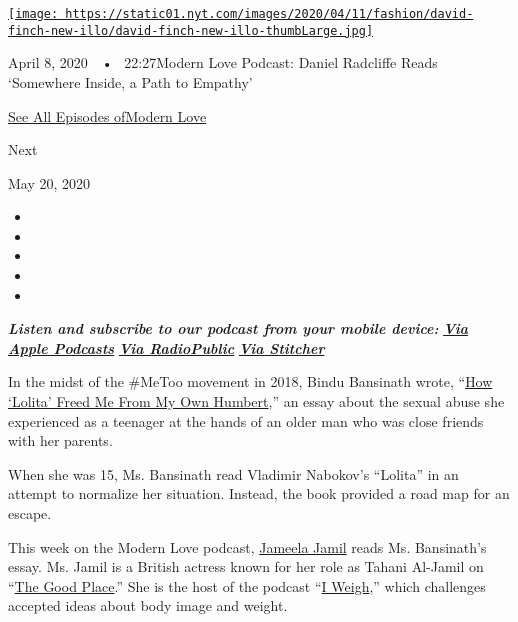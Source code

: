 \href{https://www.nytimes.com/2020/04/08/style/modern-love-podcast-daniel-radcliffe.html?action=click\&module=audio-series-bar\&region=header\&pgtype=Article}{\texttt{[image: https://static01.nyt.com/images/2020/04/11/fashion/david-finch-new-illo/david-finch-new-illo-thumbLarge.jpg]}}

April 8, 2020~~•~ 22:27Modern Love Podcast: Daniel Radcliffe Reads
`Somewhere Inside, a Path to Empathy'

\href{https://www.nytimes.com/column/modern-love-podcast}{See All
Episodes ofModern Love}

Next

May 20, 2020

\begin{itemize}
\item
\item
\item
\item
\item
\end{itemize}

\emph{\textbf{Listen and subscribe to our podcast from your mobile
device:}}
\textbf{\href{https://itunes.apple.com/us/podcast/modern-love/id1065559535?mt=2}{\emph{Via
Apple Podcasts}}} \emph{\textbf{\textbar{}}}
\textbf{\href{https://radiopublic.com/ModernLove}{\emph{Via
RadioPublic}}} \emph{\textbf{\textbar{}}}
\textbf{\href{https://www.stitcher.com/podcast/wbur/modern-love}{\emph{Via
Stitcher}}}

In the midst of the \#MeToo movement in 2018, Bindu Bansinath wrote,
``\href{https://www.nytimes.com/2018/02/16/style/modern-love-how-lolita-freed-me-from-my-own-humbert.html}{How
`Lolita' Freed Me From My Own Humbert},'' an essay about the sexual
abuse she experienced as a teenager at the hands of an older man who was
close friends with her parents.

When she was 15, Ms. Bansinath read Vladimir Nabokov's ``Lolita'' in an
attempt to normalize her situation. Instead, the book provided a road
map for an escape.

This week on the Modern Love podcast,
\href{https://www.nytimes.com/2019/09/24/style/jameela-jamil-does-her-own-makeup-sometimes-in-a-car.html}{Jameela
Jamil} reads Ms. Bansinath's essay. Ms. Jamil is a British actress known
for her role as Tahani Al-Jamil on
``\href{https://www.nbc.com/the-good-place}{The Good Place}.'' She is
the host of the podcast
``\href{https://www.earwolf.com/show/i-weigh-with-jameela-jamil/}{I
Weigh},'' which challenges accepted ideas about body image and weight.


